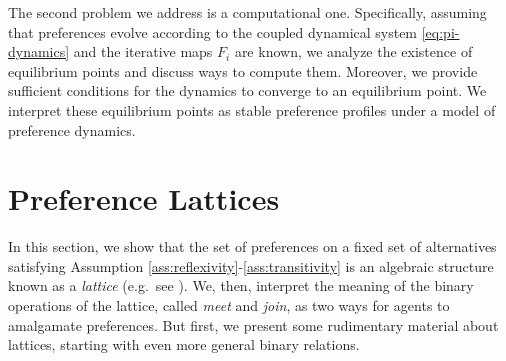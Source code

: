 \documentclass[conference]{ieeeconf}
\newcommand{\N}{\mathcal{N}}
\newcommand{\A}{\mathcal{A}}
\newcommand{\prefers}{\succsim}
\newcommand{\profile}{\boldsymbol{\pi}}
\newcommand{\metaprefers}{\sqsupseteq}
\begin{document}
The second problem we address is a computational one. Specifically, assuming that preferences evolve according to the coupled dynamical system \eqref{eq:pi-dynamics} and the iterative maps $F_i$ are known, we analyze the existence of equilibrium points and discuss ways to compute them. Moreover, we provide sufficient conditions for the dynamics to converge to an equilibrium point. We interpret these equilibrium points as stable preference profiles under a model of preference dynamics.


\vspace{-1em}
\section{Preference Lattices}
\label{sec:lattices}

In this section, we show that the set of preferences on a fixed set of alternatives satisfying Assumption \ref{ass:reflexivity}-\ref{ass:transitivity} is an algebraic structure known as a \emph{lattice} (e.g.~see \cite{roman2008}). We, then, interpret the meaning of the binary operations of the lattice, called \emph{meet} and \emph{join}, as two ways for agents to amalgamate preferences.
But first, we present some rudimentary material about lattices, starting with even more general binary relations.
\end{document}
